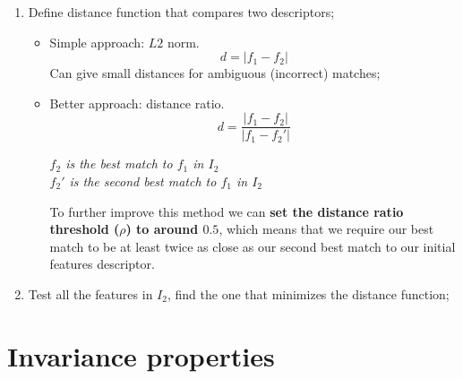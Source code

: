 \documentclass{article}
\begin{document}
\begin{enumerate}
    \item Define distance function that compares two descriptors;
    \begin{itemize}
        \item Simple approach: $L2$ norm.
        \begin{equation*}
            d = |f_1 - f_2|
        \end{equation*}
        Can give small distances for ambiguous (incorrect) matches;
        \item Better approach: distance ratio.
        \begin{equation*}
            d = \frac{|f_1 - f_2|}{|f_1 - f_2'|}
        \end{equation*}
        \begin{center}
            \textit{$f_2$ is the best match to $f_1$ in $I_2$} \\
            \textit{$f_2'$ is the second best match to $f_1$ in $I_2$}
        \end{center}
        To further improve this method we can \textbf{set the distance ratio threshold ($\rho$) to around $0.5$}, which means that we require our best match to be at least twice as close as our second best match to our initial features descriptor. 
    \end{itemize}
    \item Test all the features in $I_2$, find the one that minimizes the distance function;
\end{enumerate}

\newpage

\section*{Invariance properties}
\end{document}
